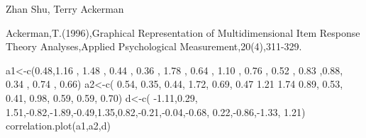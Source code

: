 \begin{Author}\relax
Zhan Shu, Terry Ackerman
\end{Author}
\begin{References}\relax
Ackerman,T.(1996),Graphical Representation of Multidimensional Item Response Theory Analyses,Applied Psychological Measurement,20(4),311-329.
\end{References}
\begin{Examples}
\begin{ExampleCode}
a1<-c(0.48,1.16 , 1.48 , 0.44 , 0.36 , 1.78 , 0.64 , 1.10 , 0.76 , 0.52 , 0.83 ,0.88, 0.34 , 0.74 , 0.66)
a2<-c( 0.54, 0.35, 0.44, 1.72, 0.69, 0.47 1.21 1.74 0.89, 0.53, 0.41, 0.98, 0.59, 0.59, 0.70)
d<-c( -1.11,0.29, 1.51,-0.82,-1.89,-0.49,1.35,0.82,-0.21,-0.04,-0.68, 0.22,-0.86,-1.33, 1.21)
correlation.plot(a1,a2,d)
\end{ExampleCode}
\end{Examples}

